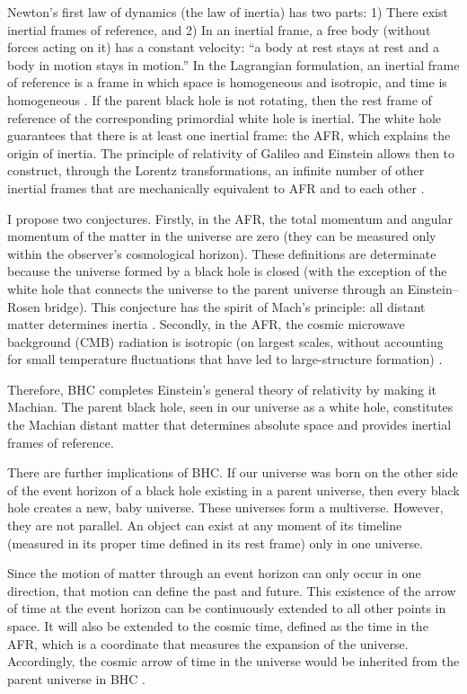 \documentclass[prd,onecolumn,nofootinbib]{revtex4}
\begin{document}
Newton's first law of dynamics (the law of inertia) has two parts: 1) There exist inertial frames of reference, and 2) In an inertial frame, a free body (without forces acting on it) has a constant velocity: “a body at rest stays at rest and a body in motion stays in motion.”
In the Lagrangian formulation, an inertial frame of reference is a frame in which space is homogeneous and isotropic, and time is homogeneous \cite{LL1}.
If the parent black hole is not rotating, then the rest frame of reference of the corresponding primordial white hole is inertial.
The white hole guarantees that there is at least one inertial frame: the AFR, which explains the origin of inertia.
The principle of relativity of Galileo and Einstein allows then to construct, through the Lorentz transformations, an infinite number of other inertial frames that are mechanically equivalent to AFR and to each other \cite{LL2}.

I propose two conjectures.
Firstly, in the AFR, the total momentum and angular momentum of the matter in the universe are zero (they can be measured only within the observer's cosmological horizon).
These definitions are determinate because the universe formed by a black hole is closed (with the exception of the white hole that connects the universe to the parent universe through an Einstein--Rosen bridge).
This conjecture has the spirit of Mach's principle: all distant matter determines inertia \cite{Mach}.
Secondly, in the AFR, the cosmic microwave background (CMB) radiation is isotropic (on largest scales, without accounting for small temperature fluctuations that have led to large-structure formation) \cite{pref}.

Therefore, BHC completes Einstein's general theory of relativity by making it Machian.
The parent black hole, seen in our universe as a white hole, constitutes the Machian distant matter that determines absolute space and provides inertial frames of reference.

There are further implications of BHC.
If our universe was born on the other side of the event horizon of a black hole existing in a parent universe, then every black hole creates a new, baby universe.
These universes form a multiverse.
However, they are not parallel.
An object can exist at any moment of its timeline (measured in its proper time defined in its rest frame) only in one universe.

Since the motion of matter through an event horizon can only occur in one direction, that motion can define the past and future.
This existence of the arrow of time at the event horizon can be continuously extended to all other points in space.
It will also be extended to the cosmic time, defined as the time in the AFR, which is a coordinate that measures the expansion of the universe.
Accordingly, the cosmic arrow of time in the universe would be inherited from the parent universe in BHC \cite{cosmo}.
\end{document}

